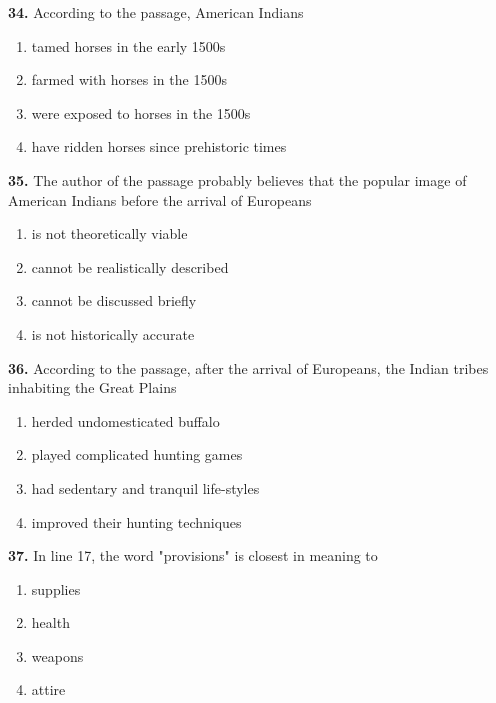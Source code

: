 \documentclass[12pt]{article}
\begin{document}
\par
\vspace{0.25\baselineskip}
\noindent\textbf{34.} According to the passage, American Indians
\begin{enumerate}[label=(\Alph*),leftmargin=*,itemsep=0.2em]
\item tamed horses in the early 1500s
\item farmed with horses in the 1500s
\item were exposed to horses in the 1500s
\item have ridden horses since prehistoric times
\end{enumerate}
\par
\vspace{0.25\baselineskip}
\noindent\textbf{35.} The author of the passage probably believes that the popular image of American Indians before the arrival of Europeans
\begin{enumerate}[label=(\Alph*),leftmargin=*,itemsep=0.2em]
\item is not theoretically viable
\item cannot be realistically described
\item cannot be discussed briefly
\item is not historically accurate
\end{enumerate}
\par
\vspace{0.25\baselineskip}
\noindent\textbf{36.} According to the passage, after the arrival of Europeans, the Indian tribes inhabiting the Great Plains
\begin{enumerate}[label=(\Alph*),leftmargin=*,itemsep=0.2em]
\item herded undomesticated buffalo
\item played complicated hunting games
\item had sedentary and tranquil life-styles
\item improved their hunting techniques
\end{enumerate}
\par
\vspace{0.25\baselineskip}
\noindent\textbf{37.} In line 17, the word "provisions" is closest in meaning to
\begin{enumerate}[label=(\Alph*),leftmargin=*,itemsep=0.2em]
\item supplies
\item health
\item weapons
\item attire
\end{enumerate}
\end{document}
